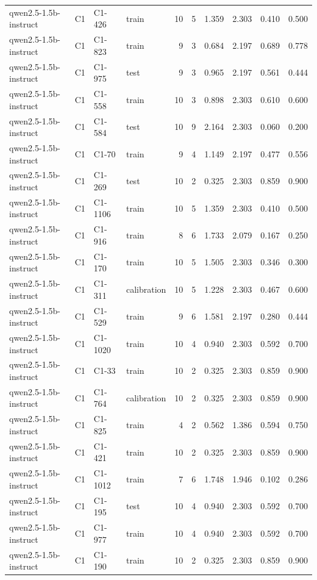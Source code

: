\begin{table}
\begin{tabular}{llllrrrrrr}
qwen2.5-1.5b-instruct & C1 & C1-426 & train & 10 & 5 & 1.359 & 2.303 & 0.410 & 0.500 \\
qwen2.5-1.5b-instruct & C1 & C1-823 & train & 9 & 3 & 0.684 & 2.197 & 0.689 & 0.778 \\
qwen2.5-1.5b-instruct & C1 & C1-975 & test & 9 & 3 & 0.965 & 2.197 & 0.561 & 0.444 \\
qwen2.5-1.5b-instruct & C1 & C1-558 & train & 10 & 3 & 0.898 & 2.303 & 0.610 & 0.600 \\
qwen2.5-1.5b-instruct & C1 & C1-584 & test & 10 & 9 & 2.164 & 2.303 & 0.060 & 0.200 \\
qwen2.5-1.5b-instruct & C1 & C1-70 & train & 9 & 4 & 1.149 & 2.197 & 0.477 & 0.556 \\
qwen2.5-1.5b-instruct & C1 & C1-269 & test & 10 & 2 & 0.325 & 2.303 & 0.859 & 0.900 \\
qwen2.5-1.5b-instruct & C1 & C1-1106 & train & 10 & 5 & 1.359 & 2.303 & 0.410 & 0.500 \\
qwen2.5-1.5b-instruct & C1 & C1-916 & train & 8 & 6 & 1.733 & 2.079 & 0.167 & 0.250 \\
qwen2.5-1.5b-instruct & C1 & C1-170 & train & 10 & 5 & 1.505 & 2.303 & 0.346 & 0.300 \\
qwen2.5-1.5b-instruct & C1 & C1-311 & calibration & 10 & 5 & 1.228 & 2.303 & 0.467 & 0.600 \\
qwen2.5-1.5b-instruct & C1 & C1-529 & train & 9 & 6 & 1.581 & 2.197 & 0.280 & 0.444 \\
qwen2.5-1.5b-instruct & C1 & C1-1020 & train & 10 & 4 & 0.940 & 2.303 & 0.592 & 0.700 \\
qwen2.5-1.5b-instruct & C1 & C1-33 & train & 10 & 2 & 0.325 & 2.303 & 0.859 & 0.900 \\
qwen2.5-1.5b-instruct & C1 & C1-764 & calibration & 10 & 2 & 0.325 & 2.303 & 0.859 & 0.900 \\
qwen2.5-1.5b-instruct & C1 & C1-825 & train & 4 & 2 & 0.562 & 1.386 & 0.594 & 0.750 \\
qwen2.5-1.5b-instruct & C1 & C1-421 & train & 10 & 2 & 0.325 & 2.303 & 0.859 & 0.900 \\
qwen2.5-1.5b-instruct & C1 & C1-1012 & train & 7 & 6 & 1.748 & 1.946 & 0.102 & 0.286 \\
qwen2.5-1.5b-instruct & C1 & C1-195 & test & 10 & 4 & 0.940 & 2.303 & 0.592 & 0.700 \\
qwen2.5-1.5b-instruct & C1 & C1-977 & train & 10 & 4 & 0.940 & 2.303 & 0.592 & 0.700 \\
qwen2.5-1.5b-instruct & C1 & C1-190 & train & 10 & 2 & 0.325 & 2.303 & 0.859 & 0.900 \\

\end{tabular}
\end{table}
